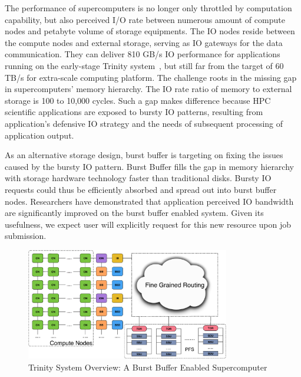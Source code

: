 The performance of supercomputers is no longer only throttled by computation capability,
but also perceived I/O rate between
numerous amount of compute nodes and 
petabyte volume of storage equipments.
The IO nodes reside between the compute nodes and external storage, 
serving as IO gateways for the data communication. 
They can deliver 810 GB/s IO performance for applications running on the early-stage Trinity system~\cite{TrinitySystem}, 
but still far from the target of 60 TB/s
for extra-scale computing platform\cite{Shalf:HPCCS:2010}.
The challenge roots in the missing gap in supercomputers' memory hierarchy.
The IO rate ratio of memory to external storage 
is 100 to 10,000 cycles\cite{TrinitySystem}.
Such a gap makes difference because HPC scientific applications are exposed to
bursty IO patterns\cite{Carns:MSST:2011, Kim:PDSW:2010},
resulting from application's
defensive IO strategy\cite{Latham:CSD:2012, Naik:ICPPW:2009, Dennis:CUG:2009}
and the needs of subsequent processing of application output.


As an alternative storage design, burst buffer\cite{Bent:HBP:2011, Grider:EXA:2010}
is targeting on fixing the issues caused by the bursty IO pattern.
Burst Buffer fills the gap in memory hierarchy with storage hardware technology
faster than traditional disks.
Bursty IO requests could thus be efficiently absorbed and spread out
into burst buffer nodes.
Researchers\cite{Liu:MSST:2012} have demonstrated that application perceived IO
bandwidth are significantly improved on the burst buffer enabled system.
Given its usefulness, we expect user will explicitly request for
this new resource upon job submission.

\begin{figure}[!t]
        \centering
        \includegraphics[width= 3.5in]{BBArchitectureShort}
        \caption{Trinity System Overview: A Burst Buffer Enabled Supercomputer}
        \label{Fig:BBArchitecture}
\end{figure}



